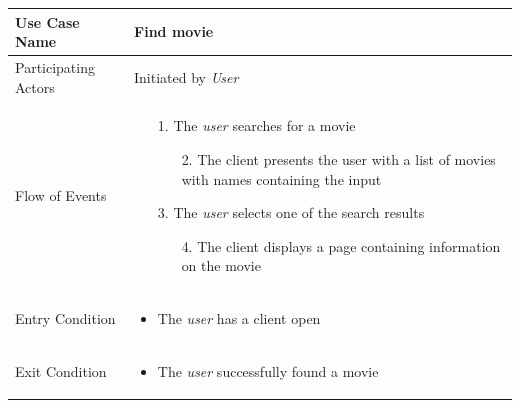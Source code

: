 \begin{center}
	\begin{tabular}{ | l | p{10cm} |  }
		 \hline
		Use Case Name & Find movie \\ \hline
		Participating Actors & Initiated by \emph{User} \\ \hline
		Flow of Events & \begin{enumerate}
						\item[1.] The \emph{user} searches for a movie
						\begin{enumerate}
							\item[2.] The client presents the user with a list of movies with names containing the input
						\end{enumerate}
						\item[3.] The \emph{user} selects one of the search results
						\begin{enumerate}
							\item[4.] The client displays a page containing information on the movie
						\end{enumerate}
					\end{enumerate} \\ \hline
		Entry Condition & \begin{itemize}
						\item The \emph{user} has a client open
					\end{itemize} \\ \hline
		Exit Condition & \begin{itemize}
						\item The \emph{user} successfully found a movie
					\end{itemize} \\
		\hline
	\end{tabular}
\end{center}

